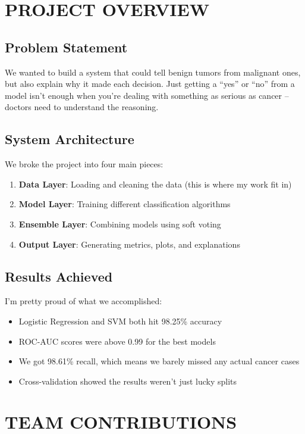 \documentclass[12pt]{article}
\begin{document}
\newpage
\section{PROJECT OVERVIEW}

\subsection{Problem Statement}
We wanted to build a system that could tell benign tumors from malignant ones, but also explain why it made each decision. Just getting a ``yes'' or ``no'' from a model isn't enough when you're dealing with something as serious as cancer -- doctors need to understand the reasoning.

\subsection{System Architecture}
We broke the project into four main pieces:
\begin{enumerate}
    \item \textbf{Data Layer}: Loading and cleaning the data (this is where my work fit in)
    \item \textbf{Model Layer}: Training different classification algorithms
    \item \textbf{Ensemble Layer}: Combining models using soft voting
    \item \textbf{Output Layer}: Generating metrics, plots, and explanations
\end{enumerate}

\subsection{Results Achieved}
I'm pretty proud of what we accomplished:
\begin{itemize}
    \item Logistic Regression and SVM both hit 98.25\% accuracy
    \item ROC-AUC scores were above 0.99 for the best models
    \item We got 98.61\% recall, which means we barely missed any actual cancer cases
    \item Cross-validation showed the results weren't just lucky splits
\end{itemize}

\newpage
\section{TEAM CONTRIBUTIONS}
\end{document}

